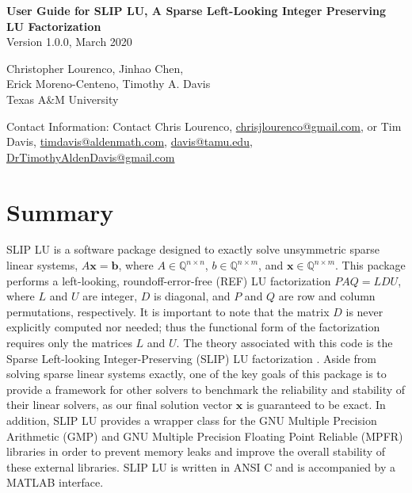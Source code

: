\documentclass[12pt]{article}
\theoremstyle{definition}
\begin{document}
\begin{center}
\begin{large}
\textbf{User Guide for SLIP LU, A Sparse Left-Looking Integer
Preserving LU Factorization} \\
\vspace{5mm}
Version 1.0.0, March 2020 %
\vspace{20mm}

Christopher Lourenco, Jinhao Chen, \\ Erick Moreno-Centeno, Timothy A. Davis \\

Texas A\&M University

\vspace{20mm}
Contact Information: Contact Chris Lourenco, \href{mailto:chrisjlourenco@gmail.com}{chrisjlourenco@gmail.com}, or Tim Davis,
\href{mailto:timdavis@aldenmath.com}{timdavis@aldenmath.com},
\href{mailto:davis@tamu.edu}{davis@tamu.edu},
\href{DrTimothyAldenDavis@gmail.com}{DrTimothyAldenDavis@gmail.com}

\end{large}
\end{center}

\newpage

\tableofcontents

\newpage

\section{Summary}
\label{s:intro}

SLIP LU is a software package designed to exactly solve unsymmetric sparse
linear systems, $ A \mathbf{x} = \mathbf{b}$, where $A \in \mathbb{Q}^{n \times
n}$, $b \in \mathbb{Q}^{n \times m}$, and $\mathbf{x} \in \mathbb{Q}^{n \times
m}$. This package performs a left-looking, roundoff-error-free (REF) LU
factorization $P A Q = L D U$, where $L$ and $U$ are integer, $D$ is diagonal,
and $P$ and $Q$ are row and column permutations, respectively. It is important
to note that the matrix $D$ is never explicitly computed nor needed; thus the
functional form of the factorization requires only the matrices $L$ and $U$.
The theory associated with this code is the Sparse Left-looking
Integer-Preserving (SLIP) LU factorization \cite{lourenco2019exact}. Aside from
solving sparse linear systems exactly, one of the key goals of this package is
to provide a framework for other solvers to benchmark the reliability and
stability of their linear solvers, as our final solution vector $\mathbf{x}$ is
guaranteed to be exact. In addition, SLIP LU provides a wrapper class for the
GNU Multiple Precision Arithmetic (GMP) \cite{granlund2015gnu} and GNU Multiple
Precision Floating Point Reliable (MPFR) \cite{fousse2007mpfr} libraries in
order to prevent memory leaks and improve the overall stability of these
external libraries. SLIP LU is written in ANSI C and is accompanied by a MATLAB
interface.
\end{document}
